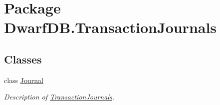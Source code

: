 \hypertarget{namespace_dwarf_d_b_1_1_transaction_journals}{
\section{Package DwarfDB.TransactionJournals}
\label{namespace_dwarf_d_b_1_1_transaction_journals}
}
\subsection*{Classes}
\begin{DoxyCompactItemize}
\item 
class \hyperlink{class_dwarf_d_b_1_1_transaction_journals_1_1_journal}{Journal}
\begin{DoxyCompactList}\small\item\em Description of \hyperlink{namespace_dwarf_d_b_1_1_transaction_journals}{TransactionJournals}. \item\end{DoxyCompactList}\end{DoxyCompactItemize}
